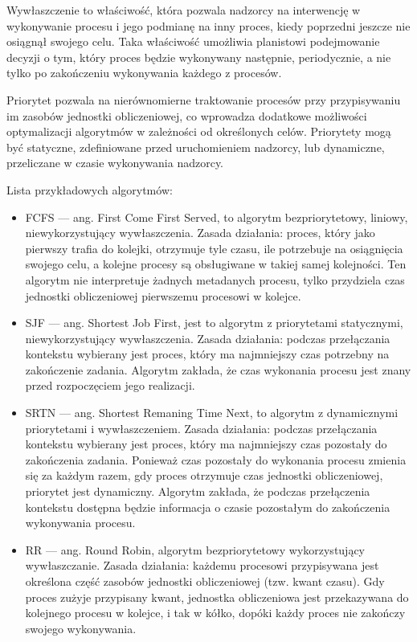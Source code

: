 \documentclass[../../main]{subfiles}
\begin{document}
Wywłaszczenie to właściwość, która pozwala nadzorcy na interwencję w wykonywanie procesu i jego podmianę na inny proces, kiedy poprzedni jeszcze nie osiągnął swojego celu. Taka właściwość umożliwia planistowi podejmowanie decyzji o tym, który proces będzie wykonywany następnie, periodycznie, a nie tylko po zakończeniu wykonywania każdego z procesów.

Priorytet pozwala na nierównomierne traktowanie procesów przy przypisywaniu im zasobów jednostki obliczeniowej, co wprowadza dodatkowe możliwości optymalizacji algorytmów w zależności od określonych celów. Priorytety mogą być statyczne, zdefiniowane przed uruchomieniem nadzorcy, lub dynamiczne, przeliczane w czasie wykonywania nadzorcy.

Lista przykładowych algorytmów:

\begin{itemize}
    \item FCFS — ang. First Come First Served, to algorytm bezpriorytetowy, liniowy, niewykorzystujący wywłaszczenia. Zasada działania: proces, który jako pierwszy trafia do kolejki, otrzymuje tyle czasu, ile potrzebuje na osiągnięcia swojego celu, a kolejne procesy są obsługiwane w takiej samej kolejności. Ten algorytm nie interpretuje żadnych metadanych procesu, tylko przydziela czas jednostki obliczeniowej pierwszemu procesowi w kolejce.
    \item SJF — ang. Shortest Job First, jest to algorytm z priorytetami statycznymi, niewykorzystujący wywłaszczenia. Zasada działania: podczas przełączania kontekstu wybierany jest proces, który ma najmniejszy czas potrzebny na zakończenie zadania. Algorytm zakłada, że czas wykonania procesu jest znany przed rozpoczęciem jego realizacji.
    \item SRTN — ang. Shortest Remaning Time Next, to algorytm z dynamicznymi priorytetami i wywłaszczeniem. Zasada działania: podczas przełączania kontekstu wybierany jest proces, który ma najmniejszy czas pozostały do zakończenia zadania. Ponieważ czas pozostały do wykonania procesu zmienia się za każdym razem, gdy proces otrzymuje czas jednostki obliczeniowej, priorytet jest dynamiczny. Algorytm zakłada, że podczas przełączenia kontekstu dostępna będzie informacja o czasie pozostałym do zakończenia wykonywania procesu.
    \item RR — ang. Round Robin, algorytm bezpriorytetowy wykorzystujący wywłaszczanie. Zasada działania: każdemu procesowi przypisywana jest określona część zasobów jednostki obliczeniowej (tzw. kwant czasu). Gdy proces zużyje przypisany kwant, jednostka obliczeniowa jest przekazywana do kolejnego procesu w kolejce, i tak w kółko, dopóki każdy proces nie zakończy swojego wykonywania.

\end{itemize}
\end{document}

